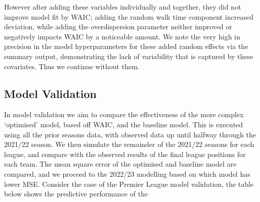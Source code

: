 \documentclass[
]{article}
\begin{document}
However after adding these variables individually and together, they did
not improve model fit by WAIC; adding the random walk time component
increased deviation, while adding the overdispersion parameter neither
improved or negatively impacts WAIC by a noticeable amount. We note the
very high in precision in the model hyperparameters for these added
random effects via the summary output, demonstrating the lack of
variability that is captured by these covariates. Thus we continue
without them.

\hypertarget{model-validation}{%
\subsection{Model Validation}\label{model-validation}}

In model validation we aim to compare the effectiveness of the more
complex `optimised' model, based off WAIC, and the baseline model. This
is executed using all the prior seasons data, with observed data up
until halfway through the 2021/22 season. We then simulate the remainder
of the 2021/22 seasons for each league, and compare with the observed
results of the final league positions for each team. The mean square
error of the optimised and baseline model are compared, and we proceed
to the 2022/23 modelling based on which model has lower MSE. Consider
the case of the Premier League model validation, the table below shows
the predictive performance of the
\end{document}
